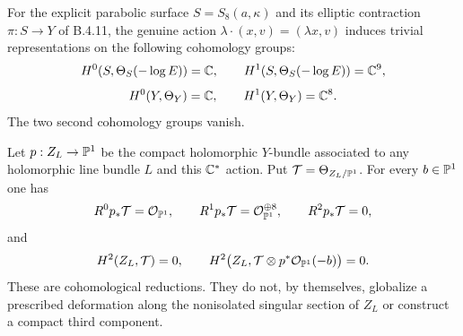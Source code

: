 \begin{proposition}
For the explicit parabolic surface $S=S_8(a,\kappa)$ and its
elliptic contraction $\pi:S\to Y$ of B.4.11, the genuine action
$\lambda\cdot(x,v)=(\lambda x,v)$ induces trivial representations
on the following cohomology groups:
\[
 H^0(S,\Theta_S(-\log E))=\mathbb C,\qquad
 H^1(S,\Theta_S(-\log E))=\mathbb C^9,
\]
\[
 H^0(Y,\Theta_Y)=\mathbb C,\qquad H^1(Y,\Theta_Y)=\mathbb C^8.
\]
The two second cohomology groups vanish.

Let $p:Z_L\to\mathbb P^1$ be the compact holomorphic $Y$-bundle
associated to any holomorphic line bundle $L$ and this
$\mathbb C^*$ action.  Put
$\mathcal T=\Theta_{Z_L/\mathbb P^1}$.
For every $b\in\mathbb P^1$ one has
\[
 R^0p_*\mathcal T=\mathcal O_{\mathbb P^1},\qquad
 R^1p_*\mathcal T=\mathcal O_{\mathbb P^1}^{\oplus8},\qquad
 R^2p_*\mathcal T=0,
\]
and
\[
 H^2(Z_L,\mathcal T)=0,
 \qquad
 H^2\bigl(Z_L,\mathcal T\otimes
                   p^*\mathcal O_{\mathbb P^1}(-b)\bigr)=0.
\]
These are cohomological reductions.  They do not, by themselves,
globalize a prescribed deformation along the nonisolated
singular section of $Z_L$ or construct a compact third component.
\end{proposition}
